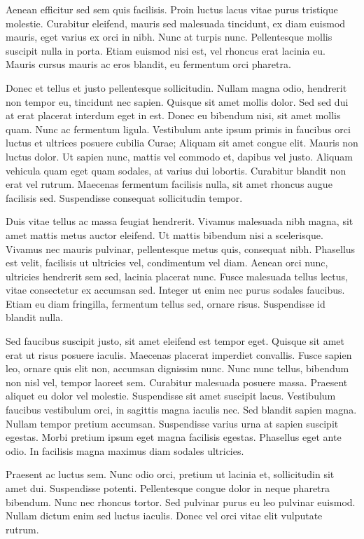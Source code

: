 Aenean efficitur sed sem quis facilisis. Proin luctus lacus vitae purus tristique molestie. Curabitur eleifend, mauris sed malesuada tincidunt, ex diam euismod mauris, eget varius ex orci in nibh. Nunc at turpis nunc. Pellentesque mollis suscipit nulla in porta. Etiam euismod nisi est, vel rhoncus erat lacinia eu. Mauris cursus mauris ac eros blandit, eu fermentum orci pharetra.

Donec et tellus et justo pellentesque sollicitudin. Nullam magna odio, hendrerit non tempor eu, tincidunt nec sapien. Quisque sit amet mollis dolor. Sed sed dui at erat placerat interdum eget in est. Donec eu bibendum nisi, sit amet mollis quam. Nunc ac fermentum ligula. Vestibulum ante ipsum primis in faucibus orci luctus et ultrices posuere cubilia Curae; Aliquam sit amet congue elit. Mauris non luctus dolor. Ut sapien nunc, mattis vel commodo et, dapibus vel justo. Aliquam vehicula quam eget quam sodales, at varius dui lobortis. Curabitur blandit non erat vel rutrum. Maecenas fermentum facilisis nulla, sit amet rhoncus augue facilisis sed. Suspendisse consequat sollicitudin tempor.

Duis vitae tellus ac massa feugiat hendrerit. Vivamus malesuada nibh magna, sit amet mattis metus auctor eleifend. Ut mattis bibendum nisi a scelerisque. Vivamus nec mauris pulvinar, pellentesque metus quis, consequat nibh. Phasellus est velit, facilisis ut ultricies vel, condimentum vel diam. Aenean orci nunc, ultricies hendrerit sem sed, lacinia placerat nunc. Fusce malesuada tellus lectus, vitae consectetur ex accumsan sed. Integer ut enim nec purus sodales faucibus. Etiam eu diam fringilla, fermentum tellus sed, ornare risus. Suspendisse id blandit nulla.

Sed faucibus suscipit justo, sit amet eleifend est tempor eget. Quisque sit amet erat ut risus posuere iaculis. Maecenas placerat imperdiet convallis. Fusce sapien leo, ornare quis elit non, accumsan dignissim nunc. Nunc nunc tellus, bibendum non nisl vel, tempor laoreet sem. Curabitur malesuada posuere massa. Praesent aliquet eu dolor vel molestie. Suspendisse sit amet suscipit lacus. Vestibulum faucibus vestibulum orci, in sagittis magna iaculis nec. Sed blandit sapien magna. Nullam tempor pretium accumsan. Suspendisse varius urna at sapien suscipit egestas. Morbi pretium ipsum eget magna facilisis egestas. Phasellus eget ante odio. In facilisis magna maximus diam sodales ultricies.

Praesent ac luctus sem. Nunc odio orci, pretium ut lacinia et, sollicitudin sit amet dui. Suspendisse potenti. Pellentesque congue dolor in neque pharetra bibendum. Nunc nec rhoncus tortor. Sed pulvinar purus eu leo pulvinar euismod. Nullam dictum enim sed luctus iaculis. Donec vel orci vitae elit vulputate rutrum.

